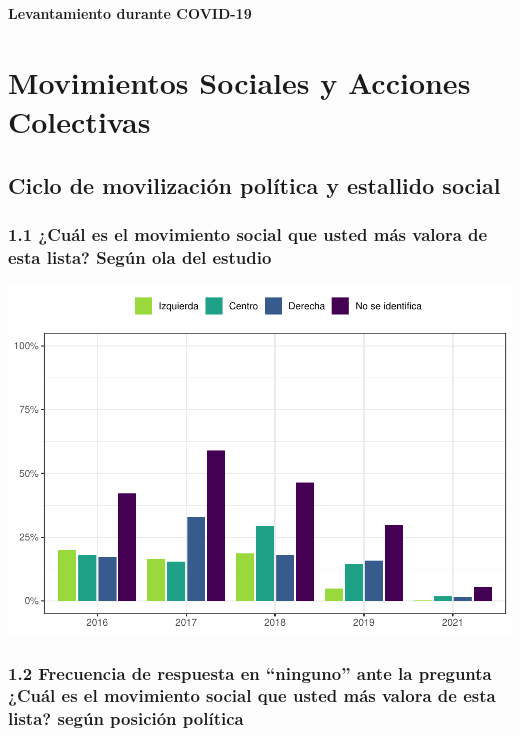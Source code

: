 \documentclass[
  12pt,
  openany]{book}
\begin{document}
\textbf{Levantamiento durante COVID-19}

\hypertarget{movimientos-sociales-y-acciones-colectivas}{%
\chapter{Movimientos Sociales y Acciones Colectivas}\label{movimientos-sociales-y-acciones-colectivas}}

\hypertarget{ciclo-de-movilizaciuxf3n-poluxedtica-y-estallido-social}{%
\section{Ciclo de movilización política y estallido social}\label{ciclo-de-movilizaciuxf3n-poluxedtica-y-estallido-social}}

\hypertarget{cuuxe1l-es-el-movimiento-social-que-usted-muxe1s-valora-de-esta-lista-seguxfan-ola-del-estudio}{%
\subsection{1.1 ¿Cuál es el movimiento social que usted más valora de esta lista? Según ola del estudio}\label{cuuxe1l-es-el-movimiento-social-que-usted-muxe1s-valora-de-esta-lista-seguxfan-ola-del-estudio}}

\includegraphics{reporte-elsoc_files/figure-latex/unnamed-chunk-7-1.pdf}

\hypertarget{frecuencia-de-respuesta-en-ninguno-ante-la-pregunta-cuuxe1l-es-el-movimiento-social-que-usted-muxe1s-valora-de-esta-lista-seguxfan-posiciuxf3n-poluxedtica}{%
\subsection{1.2 Frecuencia de respuesta en ``ninguno'' ante la pregunta ¿Cuál es el movimiento social que usted más valora de esta lista? según posición política}\label{frecuencia-de-respuesta-en-ninguno-ante-la-pregunta-cuuxe1l-es-el-movimiento-social-que-usted-muxe1s-valora-de-esta-lista-seguxfan-posiciuxf3n-poluxedtica}}
\end{document}
